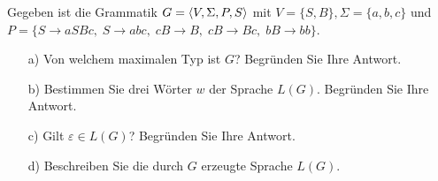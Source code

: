 
\begin{exercise}
Gegeben ist die Grammatik $G=\langle{V,\Sigma,P,S}\rangle$ mit
$V=\{S,B\}, \Sigma=\{a,b,c\}$ und\\ 
$P=\{S\rightarrow aSBc,\;S\rightarrow abc,\;cB\rightarrow B,\;cB\rightarrow Bc,\;bB\rightarrow bb\}$.
\begin{itemize}
\item[a)] Von welchem maximalen Typ ist $G$? Begründen Sie Ihre Antwort.
\item[b)] Bestimmen Sie drei Wörter $w$ der Sprache $L(G)$. Begründen Sie Ihre
  Antwort.
\item[c)] Gilt $\varepsilon \in L(G)$? Begründen Sie Ihre Antwort.
\item[d)] Beschreiben Sie die durch $G$ erzeugte Sprache $L(G)$.
\end{itemize}
\end{exercise}

